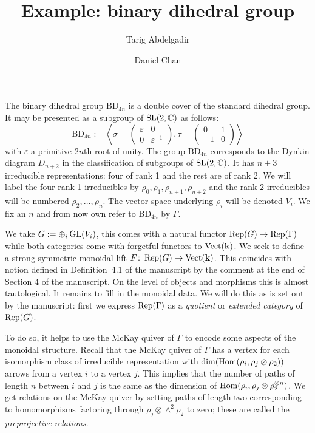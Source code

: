 \documentclass[11pt]{amsart}
\title{Example: binary dihedral group}
\author{Tarig Abdelgadir}
\author{Daniel Chan}
\begin{document}
\maketitle

The binary dihedral group $\text{BD}_{4n}$ is a double cover of the standard dihedral group. It may be presented as a subgroup of $\operatorname{SL}(2,\mathbb{C})$ as follows:
\[
\text{BD}_{4n}:= \left\langle \sigma=\left(\begin{array}{cc} \varepsilon & 0 \\ 0 & \varepsilon^{-1} \end{array} \right), \tau=\left( \begin{array}{cc} 0 & 1 \\ -1 & 0 \end{array} \right) \right\rangle
\]
with $\varepsilon$ a primitive $2n$th root of unity.
The group BD$_{4n}$ corresponds to the Dynkin diagram $D_{n+2}$ in the classification of subgroups of $\operatorname{SL}(2,\mathbb{C})$.
It has $n+3$ irreducible representations: four of rank 1 and the rest are of rank 2.
We will label the four rank 1 irreducibles by $\rho_0,\rho_1,\rho_{n+1},\rho_{n+2}$ and the rank 2 irreducibles will be numbered $\rho_2, \ldots, \rho_{n}$.
The vector space underlying $\rho_i$ will be denoted $V_i$.
We fix an $n$ and from now own refer to BD$_{4n}$ by $\Gamma$.

We take $G:=\oplus_i \operatorname{GL}(V_i)$, this comes with a natural functor $\operatorname{Rep}(G) \rightarrow \operatorname{Rep}(\Gamma)$ while both categories come with forgetful functors to $\operatorname{Vect}(\mathbf{k})$.
We seek to define a strong symmetric monoidal lift $F \colon \operatorname{Rep}(G) \rightarrow \operatorname{Vect}(\mathbf{k})$.
This coincides with notion defined in Definition~4.1 of the manuscript by the comment at the end of Section 4 of the manuscript.
On the level of objects and morphisms this is almost tautological.
It remains to fill in the monoidal data.
We will do this as is set out by the manuscript: first we express $\operatorname{Rep}(\Gamma)$ as a {\em quotient} or {\em extended category} of $\operatorname{Rep}(G)$.

To do so, it helps to use the McKay quiver of $\Gamma$ to encode some aspects of the monoidal structure.
Recall that the McKay quiver of $\Gamma$ has a vertex for each isomorphism class of irreducible representation with $\dim(\operatorname{Hom}(\rho_i,\rho_j \otimes \rho_2))$ arrows from a vertex $i$ to a vertex $j$.
This implies that the number of paths of length $n$ between $i$ and $j$ is the same as the dimension of $\operatorname{Hom}(\rho_i, \rho_j \otimes \rho_2^{\otimes n})$.
We get relations on the McKay quiver by setting paths of length two corresponding to homomorphisms factoring through $\rho_j \otimes \wedge^2 \rho_2$ to zero; these are called the {\em preprojective relations}.
\end{document}
